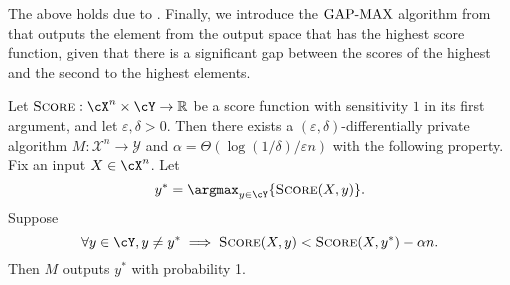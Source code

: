 The above holds due
to \cite{BunNS16,Vadhan17}. Finally, we introduce the
$\mathrm{GAP\text{-}MAX}$ algorithm from \cite{BunDRS18} that outputs
the element from the output space that has the highest
score function, given that there is a significant gap
between the scores of the highest and the second to the
highest elements.

\begin{lemma}\label{lem:gap-max}
    Let $\Score:\cX^n \times \cY \rightarrow \RR$ be a
    score function with sensitivity $1$ in its
    first argument, and let $\varepsilon,\delta>0$. Then there exists a $(\varepsilon,\delta)$-differentially private algorithm $M : \mathcal{X}^n \to \mathcal{Y}$ and $\alpha=\Theta(\log(1/\delta)/\varepsilon n)$ with the following property. Fix an input
    $X \in \cX^n$. Let
    $$y^* = \argmax_{y \in \cY}\{\Score(X,y)\}.$$
    Suppose
    $$\forall y \in \cY, y \neq y^* \implies \Score(X,y) < \Score(X,y^*)-\alpha n.$$
    Then $M$ outputs $y^*$ with probability 1.
\end{lemma}
